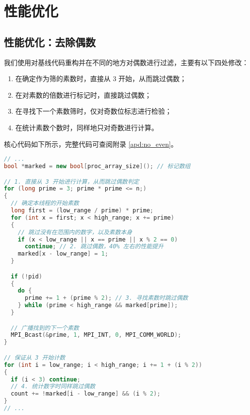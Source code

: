 \documentclass[11pt]{article}
\begin{document}
  \pagebreak
  \section{性能优化}
  \subsection{性能优化：去除偶数}
  我们使用对基线代码重构并在不同的地方对偶数进行过滤，主要有以下四处修改：
  \begin{enumerate}[itemindent=1em]
    \item 在确定作为筛的素数时，直接从 3 开始，从而跳过偶数；
    \item 在对素数的倍数进行标记时，直接跳过偶数；
    \item 在寻找下一个素数筛时，仅对奇数位标志进行检验；
    \item 在统计素数个数时，同样地只对奇数进行计算。
  \end{enumerate}

  核心代码如下所示，完整代码可查阅附录 \ref{apd:no_even}。

  \begin{file}
    \begin{lstlisting}[language=C++]
// ...
bool *marked = new bool[proc_array_size](); // 标记数组

// 1. 直接从 3 开始进行计算，从而跳过偶数判定
for (long prime = 3; prime * prime <= n;)
{
  // 确定本线程的开始素数
  long first = (low_range / prime) * prime;
  for (int x = first; x < high_range; x += prime)
  {
    // 跳过没有在范围内的数字，以及素数本身
    if (x < low_range || x == prime || x % 2 == 0)
      continue; // 2. 跳过偶数，40% 左右的性能提升
    marked[x - low_range] = 1;
  }

  if (!pid)
  {
    do {
      prime += 1 + (prime % 2); // 3. 寻找素数时跳过偶数
    } while (prime < high_range && marked[prime]);
  }

  // 广播找到的下一个素数
  MPI_Bcast(&prime, 1, MPI_INT, 0, MPI_COMM_WORLD);
}

// 保证从 3 开始计数
for (int i = low_range; i < high_range; i += 1 + (i % 2))
{
  if (i < 3) continue;
  // 4. 统计数字时同样跳过偶数
  count += !marked[i - low_range] && (i % 2);
}
// ...
    \end{lstlisting}
  \end{file}
\end{document}
